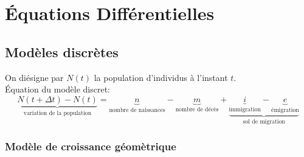 \chapter{Équations Différentielles}
\section{Modèles discrètes}
On diésigne par $N(t)$ la population d'individus à l'instant  $t$.\\
Équation du modèle discret:
 \[
     \underbrace{N(t + \Delta t) - N(t)}_{\text{variation de la population}} = \underbrace{n}_{\text{nombre de naissances}} - \underbrace{m}_{\text{nombre de décès}} + \underbrace{ \underbrace{i}_{\text{immigration}} - \underbrace{e}_{\text{émigration}} }_{\text{sol de migration}}
\] 
\subsection{Modèle de croissance géomètrique}

